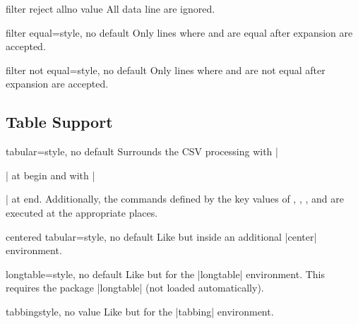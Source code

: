 \documentclass[a4paper,11pt]{ltxdoc}
\begin{document}
\begin{docCsvKey}{filter reject all}{}{no value}
  All data line are ignored.
\end{docCsvKey}


\begin{docCsvKey}{filter equal}{=}{style, no default}
  Only lines where  and  are equal after expansion
  are accepted.
\end{docCsvKey}


\begin{docCsvKey}{filter not equal}{=}{style, no default}
  Only lines where  and  are not equal after expansion
  are accepted.
\end{docCsvKey}




\clearpage
\subsection{Table Support}\label{subsec:tabsupport}%

\begin{docCsvKey}{tabular}{=}{style, no default}
  Surrounds the CSV processing with |\begin{tabular}|
  at begin and with |\end{tabular}| at end.
Additionally, the commands defined by the key values of
  , , ,
  and  are executed at the appropriate places.
\end{docCsvKey}


\begin{docCsvKey}{centered tabular}{=}{style, no default}
  Like  but inside an additional |center| environment.
\end{docCsvKey}


\begin{docCsvKey}{longtable}{=}{style, no default}
  Like  but for the |longtable| environment.
  This requires the package |longtable| (not loaded automatically).
\end{docCsvKey}


\begin{docCsvKey}{tabbing}{}{style, no value}
  Like  but for the |tabbing| environment.
\end{docCsvKey}
\end{document}
